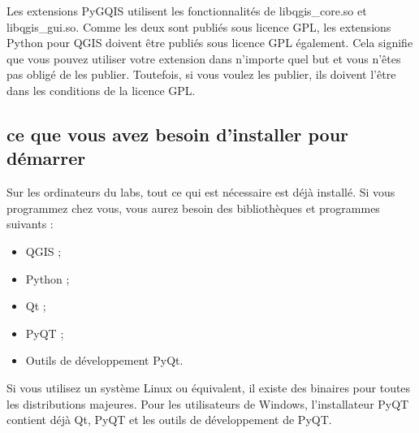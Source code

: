 Les extensions PyGQIS utilisent les fonctionnalit\'es de libqgis\_core.so et
libqgis\_gui.so. Comme les deux sont publi\'es sous licence GPL, les extensions
Python pour QGIS doivent \^etre publi\'es sous licence GPL \'egalement. Cela signifie
que vous pouvez utiliser votre extension dans n'importe quel but et vous n'\^etes pas
oblig\'e de les publier. Toutefois, si vous voulez les publier, ils doivent l'\^etre
dans les conditions de la licence GPL.

\subsection{ce que vous avez besoin d'installer pour d\'emarrer}

Sur les ordinateurs du labs, tout ce qui est n\'ecessaire est d\'ej\`a install\'e. Si
vous programmez chez vous, vous aurez besoin des biblioth\`eques et programmes
suivants :

\begin{itemize}
\item QGIS ;
\item Python ;
\item Qt ;
\item PyQT ;
\item Outils de d\'eveloppement PyQt.
\end{itemize}

Si vous utilisez un syst\`eme Linux ou \'equivalent, il existe des binaires pour
toutes les distributions majeures. Pour les utilisateurs de Windows,
l'installateur PyQT contient d\'ej\`a Qt, PyQT et les outils de d\'eveloppement de
PyQT.


